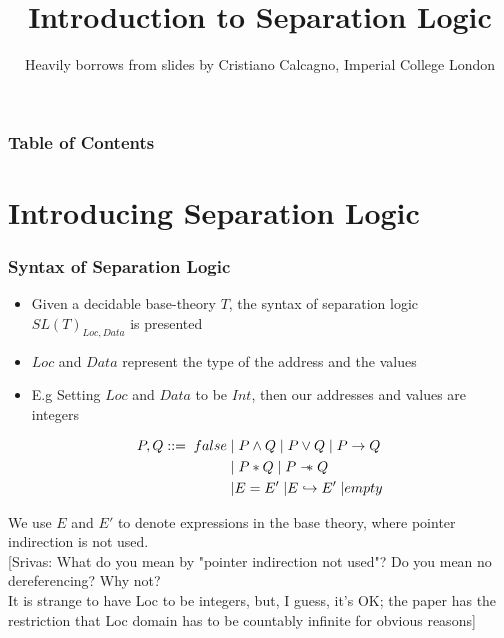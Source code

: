 \documentclass{beamer}
\title %
{Introduction to Separation Logic}
\author[\footnote{Heavily}]%
{Heavily borrows from slides by Cristiano Calcagno, Imperial College London}
\newcommand\sepimp{\mathrel{-\mkern-6mu*}}
\newcommand{\mscmt}[1]{{\color{blue} [Srivas: {#1}]}}
\begin{document}
\frame{\titlepage}



\begin{frame}
\frametitle{Table of Contents}
\tableofcontents
\end{frame}


\section{Introducing Separation Logic}

\begin{frame}
\frametitle{Syntax of Separation Logic}
\begin{itemize}
\item Given a decidable base-theory $T$, the syntax of separation logic $SL(T)_{Loc,Data}$ is presented
\item $Loc$ and $Data$ represent the type of the address and the values
\item E.g Setting $Loc$ and $Data$ to be $Int$, then our addresses and values are integers
\end{itemize}

\begin{align*}
    P,Q ::= \; false \;
          & \lvert \; P \land Q \;
          \lvert \; P \lor Q \;
          \lvert \; P \to Q \\
          & \lvert \; P * Q \;
            \lvert \; P \sepimp Q \\
          & \lvert E = E' \;
            \lvert E \hookrightarrow E' \;
            \lvert empty
\end{align*}

We use $E$ and $E'$ to denote expressions in the base theory, where pointer indirection is not used. \\
\mscmt{\tiny{What do you mean by "pointer indirection not used"? Do you mean no dereferencing?  Why not?} \\[-0.15cm]
It is strange to have Loc to be integers, but, I guess, it's OK; the paper has the restriction that Loc domain has to be
countably infinite
for obvious reasons}
\end{frame}
\end{document}
